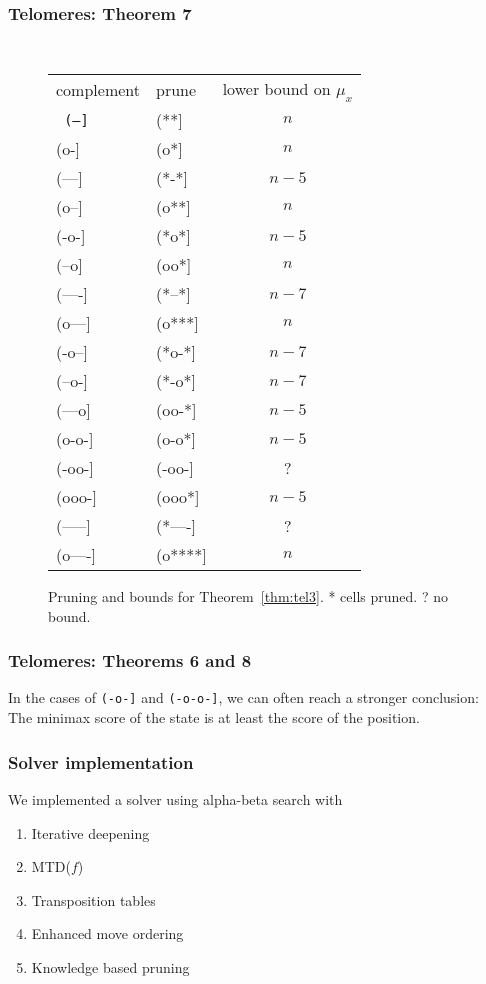 \documentclass{beamer}
\begin{document}
    \begin{frame}
        \frametitle{Telomeres: Theorem 7}
            \begin{figure}
            {\small\tt
            \begin{tabular}{llc}
            complement & prune & lower bound on $\mu_x$ \\
            \tt
            (--] & (**] & {$n$} \\
            (o-] & (o*] & {$n$} \\
            (---]& (*-*] &  {$n-5$} \\
            (o--]& (o**] &  {$n$} \\
            (-o-]& (*o*] &  {$n-5$} \\
            (--o]& (oo*] &  {$n$}\\
            (----]& (*--*]&  {$n-7$} \\
            (o---]& (o***]&  {$n$} \\
            (-o--]& (*o-*]&  {$n-7$} \\
            (--o-]& (*-o*]&  {$n-7$}\\
            (---o]& (oo-*]&  {$n-5$}\\
            (o-o-]& (o-o*]&  {$n-5$}\\
            (-oo-]& (-oo-]&  ?\\
            (ooo-]& (ooo*]&  {$n-5$}\\
            (-----]& (*----]& ? \\
            (o----]& (o****]& {$n$} \\
            \end{tabular}
            }
            \caption{Pruning and bounds for Theorem~\ref{thm:tel3}. * cells pruned. ? no bound.}
            \label{fig:tel3}
            \end{figure}
    \end{frame}

    \begin{frame}
        \frametitle{Telomeres: Theorems 6 and 8}
        In the cases of \texttt{(-o-]} and \texttt{(-o-o-]}, we can often reach a stronger conclusion: \\\medskip
        The minimax score of the state is at least the score of the position.
    \end{frame}

    \begin{frame}
        \frametitle{Solver implementation}
        We implemented a solver using alpha-beta search with
        \begin{enumerate}
            \item Iterative deepening
            \item MTD($f$)
            \item Transposition tables
            \item Enhanced move ordering
            \item Knowledge based pruning
        \end{enumerate}
    \end{frame}
\end{document}

